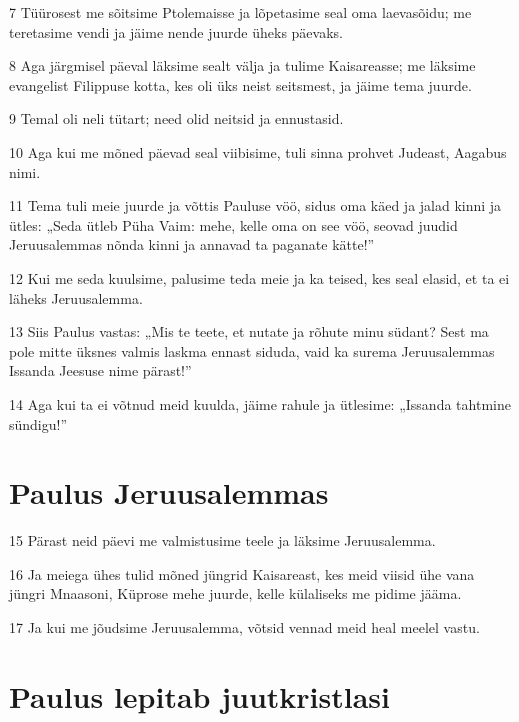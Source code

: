 \par 7 Tüürosest me sõitsime Ptolemaisse ja lõpetasime seal oma laevasõidu; me teretasime vendi ja jäime nende juurde üheks päevaks.
\par 8 Aga järgmisel päeval läksime sealt välja ja tulime Kaisareasse; me läksime evangelist Filippuse kotta, kes oli üks neist seitsmest, ja jäime tema juurde.
\par 9 Temal oli neli tütart; need olid neitsid ja ennustasid.
\par 10 Aga kui me mõned päevad seal viibisime, tuli sinna prohvet Judeast, Aagabus nimi.
\par 11 Tema tuli meie juurde ja võttis Pauluse vöö, sidus oma käed ja jalad kinni ja ütles: „Seda ütleb Püha Vaim: mehe, kelle oma on see vöö, seovad juudid Jeruusalemmas nõnda kinni ja annavad ta paganate kätte!”
\par 12 Kui me seda kuulsime, palusime teda meie ja ka teised, kes seal elasid, et ta ei läheks Jeruusalemma.
\par 13 Siis Paulus vastas: „Mis te teete, et nutate ja rõhute minu südant? Sest ma pole mitte üksnes valmis laskma ennast siduda, vaid ka surema Jeruusalemmas Issanda Jeesuse nime pärast!”
\par 14 Aga kui ta ei võtnud meid kuulda, jäime rahule ja ütlesime: „Issanda tahtmine sündigu!”

\section*{Paulus Jeruusalemmas}

\par 15 Pärast neid päevi me valmistusime teele ja läksime Jeruusalemma.
\par 16 Ja meiega ühes tulid mõned jüngrid Kaisareast, kes meid viisid ühe vana jüngri Mnaasoni, Küprose mehe juurde, kelle külaliseks me pidime jääma.
\par 17 Ja kui me jõudsime Jeruusalemma, võtsid vennad meid heal meelel vastu.

\section*{Paulus lepitab juutkristlasi}

